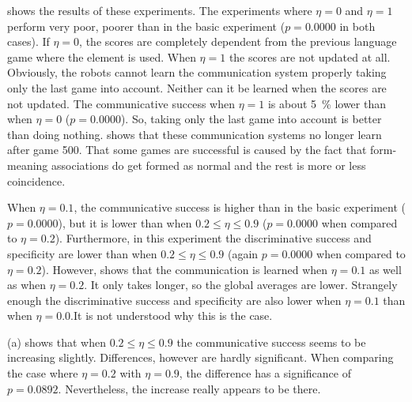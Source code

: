  shows the results of these experiments. The experiments where $\eta=0$ and $\eta=1$ perform very poor, poorer than in the basic experiment ($p=0.0000$ in both cases). If $\eta=0$, the scores are completely dependent from the previous language game where the element is used. When $\eta=1$ the scores are not updated at all. Obviously, the robots cannot learn the communication system properly taking only the last game into account. Neither can it be learned when the scores are not updated. The communicative success when $\eta=1$ is about 5~\% lower than when $\eta=0$ ($p=0.0000$). So, taking only the last game into account is better than doing nothing.  shows that these communication systems no longer learn after game 500. That some games are successful is caused by the fact that form-meaning associations do get formed as normal and the rest is more or less coincidence.

When $\eta=0.1$, the communicative success is higher than in the basic experiment ($p=0.0000$), but it is lower than when $0.2\leq\eta\leq0.9$ ($p=0.0000$ when compared to $\eta=0.2$). Furthermore, in this experiment the discriminative success and specificity are lower than when $0.2\leq\eta\leq0.9$ (again $p=0.0000$ when compared to $\eta=0.2$). However,  shows that the communication is learned when $\eta=0.1$ as well as when $\eta=0.2$. It only takes longer, so the global averages are lower. Strangely enough the discriminative success and specificity are also lower when $\eta=0.1$ than when $\eta=0.0$.It is not understood why this is the case.

 (a) shows that  when $0.2 \leq \eta \leq 0.9$ the communicative success seems to be increasing slightly. Differences, however are hardly significant. When comparing the case where $\eta=0.2$ with $\eta=0.9$, the difference has a significance of $p=0.0892$. Nevertheless, the increase really appears to be there.\enlargethispage{2\baselineskip}

